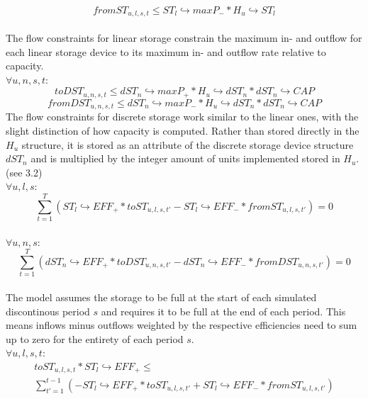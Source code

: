 \documentclass[
	11pt,								%
	DIV10,								%
	a4paper,         					%
	oneside,							%
	headheight=20pt,					%
	footheight=20pt,					%
    parskip=full,						%
    listof=totoc,						%
	bibliography=totoc,					%
	index=totoc,						%
]{scrartcl}
\begin{document}
	\begin{equation}
		fromST_{u,l,s,t} \leq ST_l\hookrightarrow  maxP_{-} * H_u \hookrightarrow ST_l
	\end{equation}
	\\
	The flow constraints for linear storage constrain the maximum in- and outflow for each linear storage device to its maximum in- and outflow rate relative to capacity.
	\\
	$\forall u,n,s,t$:
	\begin{equation}
		toDST_{u,n,s,t} \leq dST_n\hookrightarrow  maxP_{+} * H_u \hookrightarrow dST_n * dST_n \hookrightarrow CAP
	\end{equation}
	\begin{equation}
		fromDST_{u,n,s,t} \leq dST_n\hookrightarrow  maxP_{-} * H_u \hookrightarrow dST_n * dST_n \hookrightarrow CAP
	\end{equation}
	The flow constraints for discrete storage work similar to the linear ones, with the slight distinction of how capacity is computed. Rather than stored directly in the $H_u$ structure, it is stored as an attribute of the discrete storage device structure $dST_n$ and is multiplied by the integer amount of units implemented stored in $H_u$. (see 3.2)
	\\
	$\forall u,l,s$:
	\begin{equation}
		\sum_{t=1}^{T}(ST_l \hookrightarrow EFF_{+} * toST_{u,l,s,t'} - ST_l \hookrightarrow EFF_{-} * fromST_{u,l,s,t'}) = 0
	\end{equation}
	\\
	$\forall u,n,s$:
	\begin{equation}
		\sum_{t=1}^{T}(dST_n \hookrightarrow EFF_{+} * toDST_{u,n,s,t'} - dST_n \hookrightarrow EFF_{-} * fromDST_{u,n,s,t'}) = 0
	\end{equation}
	\\
	The model assumes the storage to be full at the start of each simulated discontinous period $s$ and requires it to be full at the end of each period. This means inflows minus outflows weighted by the respective efficiencies need to sum up to zero for the entirety of each period $s$.
	\\
	$\forall u,l,s,t$:
	\begin{equation}
		\begin{split}
		toST_{u,l,s,t} * ST_l \hookrightarrow EFF_{+} \leq \\
		\sum_{t'=1}^{t-1}(-ST_l \hookrightarrow EFF_{+} * toST_{u,l,s,t'} + ST_l \hookrightarrow EFF_{-} * fromST_{u,l,s,t'})
		\end{split}
	\end{equation}
\end{document}
